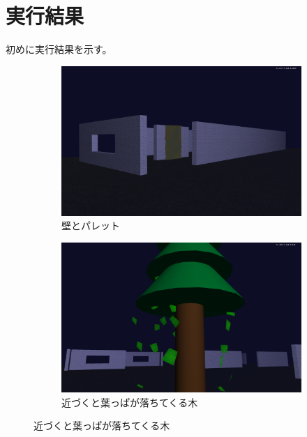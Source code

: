 \documentclass[uplatex,dvipdfmx,a4paper]{jsarticle}
\begin{document}
\section{実行結果}
初めに実行結果を示す。
\begin{figure}[H]
    \centering
    \begin{subfigure}[b]{0.48\linewidth}
        \includegraphics[width=\linewidth]{result1.png}
        \caption{壁とパレット}
        \label{fig:result1}
    \end{subfigure}
    \hfill
    \begin{subfigure}[b]{0.48\linewidth}
        \includegraphics[width=\linewidth]{result2.png}
        \caption{近づくと葉っぱが落ちてくる木}
        \label{fig:result2}
    \end{subfigure}

    \vspace{4mm}


\end{figure}
\end{document}
